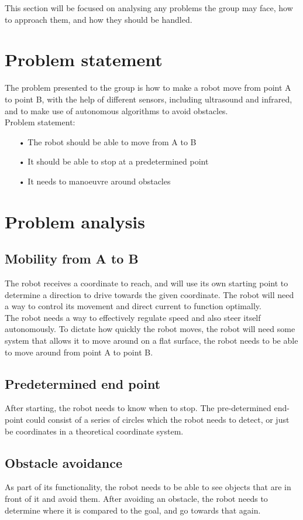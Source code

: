 This section will be focused on analysing any problems the group may face, how to approach them, and how they should be handled.

\section{Problem statement}

The problem presented to the group is how to make a robot move from point A to point B, with the help of different sensors, including ultrasound and infrared, and to make use of autonomous algorithms to avoid obstacles. \\

Problem statement:
\begin{enumerate}
\item[•]The robot should be able to move from A to B
\item[•]It should be able to stop at a predetermined point
\item[•]It needs to manoeuvre around obstacles
\end{enumerate}

\section{Problem analysis}
\subsection{Mobility from A to B}
The robot receives a coordinate to reach, and will use its own starting point to determine a direction to drive towards the given coordinate. The robot will need a way to control its movement and direct current to function optimally.\\
The robot needs a way to effectively regulate speed and also steer itself autonomously. To dictate how quickly the robot moves, the robot will need some system that allows it to move around on a flat surface, the robot needs to be able to move around from point A to point B.\

\subsection{Predetermined end point}
After starting, the robot needs to know when to stop. The pre-determined end-point could consist of a series of circles which the robot needs to detect, or just be coordinates in a theoretical coordinate system.

\subsection{Obstacle avoidance}
As part of its functionality, the robot needs to be able to see objects that are in front of it and avoid them. After avoiding an obstacle, the robot needs to determine where it is compared to the goal, and go towards that again.

